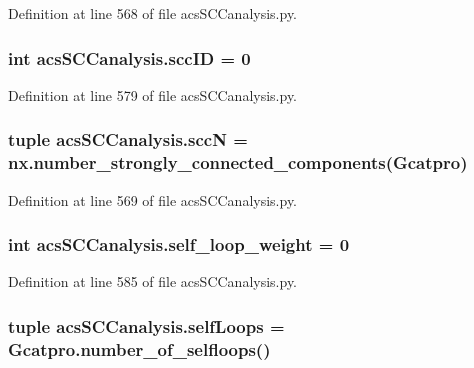 Definition at line 568 of file acs\-S\-C\-Canalysis.\-py.

\hypertarget{a00128_a1dd3c43841ba4485a66889600f099a0c}{
\subsubsection[{scc\-I\-D}]{\setlength{\rightskip}{0pt plus 5cm}int acs\-S\-C\-Canalysis.\-scc\-I\-D = 0}}\label{a00128_a1dd3c43841ba4485a66889600f099a0c}


Definition at line 579 of file acs\-S\-C\-Canalysis.\-py.

\hypertarget{a00128_a185cbf8ef1ec67f52695562582418793}{
\subsubsection[{scc\-N}]{\setlength{\rightskip}{0pt plus 5cm}tuple acs\-S\-C\-Canalysis.\-scc\-N = nx.\-number\-\_\-strongly\-\_\-connected\-\_\-components({\bf Gcatpro})}}\label{a00128_a185cbf8ef1ec67f52695562582418793}


Definition at line 569 of file acs\-S\-C\-Canalysis.\-py.

\hypertarget{a00128_ae9790fbc87f233c94224436a9cbd59c1}{
\subsubsection[{self\-\_\-loop\-\_\-weight}]{\setlength{\rightskip}{0pt plus 5cm}int acs\-S\-C\-Canalysis.\-self\-\_\-loop\-\_\-weight = 0}}\label{a00128_ae9790fbc87f233c94224436a9cbd59c1}


Definition at line 585 of file acs\-S\-C\-Canalysis.\-py.

\hypertarget{a00128_a8fec45ae9b70981ce94eaeed14d888b1}{
\subsubsection[{self\-Loops}]{\setlength{\rightskip}{0pt plus 5cm}tuple acs\-S\-C\-Canalysis.\-self\-Loops = Gcatpro.\-number\-\_\-of\-\_\-selfloops()}}\label{a00128_a8fec45ae9b70981ce94eaeed14d888b1}


